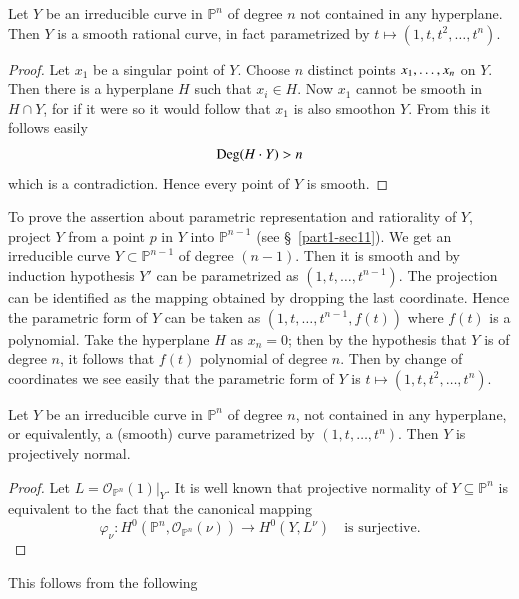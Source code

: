 {\begin{lemma}\label{part1-lem13.2}
Let $Y$ be an irreducible curve in $\mathbb{P}^{n}$ of degree $n$ not
contained in any hyperplane. Then $Y$ is a smooth rational curve, in
fact parametrized by $t\mapsto (1,t,t^{2},\ldots,t^{n})$.
\end{lemma}

\begin{proof}
Let $x_{1}$ be a singular point of $Y$. Choose $n$ distinct points
$x_{1},\ldots,\break x_{n}$ on $Y$. Then there is a hyperplane $H$ such that
$x_{i}\in H$. Now $x_{1}$ cannot be smooth in $H\cap Y$, for if it
were so it would follow that $x_{1}$ is also smooth\pageoriginale on
$Y$. From this it follows easily
$$
\operatorname{Deg}(H\cdot Y)>n
$$
which is a contradiction. Hence every point of $Y$ is smooth.
\end{proof}

To prove the assertion about parametric representation and ratiorality
of $Y$, project $Y$ from a point $p$ in $Y$ into $\mathbb{P}^{n-1}$
(see \S\ \ref{part1-sec11}). We get an irreducible curve $Y\subset
\mathbb{P}^{n-1}$ of degree $(n-1)$. Then it is smooth and by
induction hypothesis $Y'$ can be parametrized as
$(1,t,\ldots,t^{n-1})$. The projection can be identified as the
mapping obtained by dropping the last coordinate. Hence the parametric
form of $Y$ can be taken as $(1,t,\ldots,t^{n-1},f(t))$ where $f(t)$
is a polynomial. Take the hyperplane $H$ as $x_{n}=0$; then by the
hypothesis that $Y$ is of degree $n$, it follows that $f(t)$
polynomial of degree $n$. Then by change of coordinates we see easily
that the parametric form of $Y$ is $t\mapsto
(1,t,t^{2},\ldots,t^{n})$. 

\begin{lemma}\label{part1-lem13.3}
Let $Y$ be an irreducible curve in $\mathbb{P}^{n}$ of degree $n$, not
contained in any hyperplane, or equivalently, a (smooth) curve
parametri\-zed by $(1,t,\ldots,t^{n})$. Then $Y$ is projectively normal.
\end{lemma}

\begin{proof}
Let $L=\mathscr{O}_{\mathbb{P}^{n}}(1)|_{Y}$. It is well known that
projective normality of $Y\subseteq \mathbb{P}^{n}$ is equivalent to
the fact that the canonical mapping
$$
\varphi_{\nu}:H^{0}(\mathbb{P}^{n},\mathscr{O}_{\mathbb{P}^{n}}(\nu))\to
H^{0}(Y,L^{\nu})\quad\text{is surjective.}
$$
\end{proof}

This follows from the following

}
